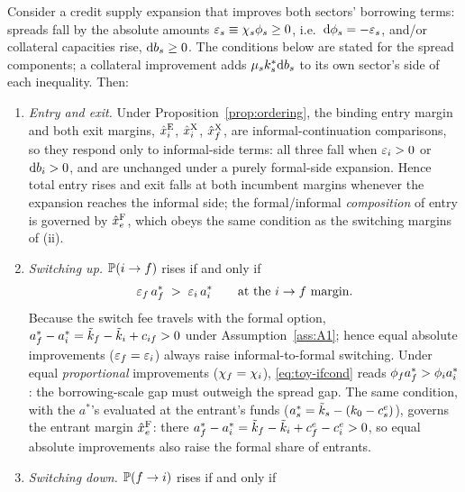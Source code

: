 \documentclass[12pt]{article}
\begin{document}
\begin{corollary}
\label{cor:bothmargins}
Consider a credit supply expansion that improves both sectors'
borrowing terms: spreads fall by the absolute amounts
$\varepsilon_{s}\equiv\chi_{s}\phi_{s}\geq0$, i.e.\
$\mathrm{d}\phi_{s}=-\varepsilon_{s}$, and/or collateral capacities
rise, $\mathrm{d}b_{s}\geq0$. The conditions below are stated for
the spread components; a collateral improvement adds
$\mu_{s}k^{*}_{s}\mathrm{d}b_{s}$ to its own sector's side of each
inequality. Then:
\begin{enumerate}
    \item[(i)] \emph{Entry and exit.} Under Proposition~\ref{prop:ordering}, the binding entry margin and both exit margins, $\hat{x}^{\mathrm{E}}_{i}$, $\hat{x}^{\mathrm{X}}_{i}$, $\hat{x}^{\mathrm{X}}_{f}$, are informal-continuation comparisons, so they respond only to informal-side terms: all three fall when $\varepsilon_{i}>0$ or $\mathrm{d}b_{i}>0$, and are unchanged under a purely formal-side expansion. Hence total entry rises and exit falls at both incumbent margins whenever the expansion reaches the informal side; the formal/informal \emph{composition} of entry is governed by $\hat{x}^{\mathrm{F}}_{e}$, which obeys the same condition as the switching margins of (ii).
    \item[(ii)] \emph{Switching up.} $\mathbb{P}(i\to f)$ rises if and only if
    \begin{equation}
        \varepsilon_{f}\,a^{*}_{f}
        \;>\;
        \varepsilon_{i}\,a^{*}_{i}
        \qquad\text{at the } i\to f \text{ margin.}
        \label{eq:toy-ifcond}
    \end{equation}
    Because the switch fee travels with the formal option, $a^{*}_{f}-a^{*}_{i}
    =\tilde{k}_{f}-\tilde{k}_{i}+c_{if}>0$ under Assumption~\ref{ass:A1}; hence equal absolute improvements ($\varepsilon_{f}=\varepsilon_{i}$) always raise informal-to-formal switching. Under equal \emph{proportional} improvements ($\chi_{f}=\chi_{i}$), \eqref{eq:toy-ifcond} reads $\phi_{f}a^{*}_{f}>\phi_{i}a^{*}_{i}$: the borrowing-scale gap must outweigh the spread gap. The same condition, with the $a^{*}$'s evaluated at the entrant's funds ($a^{*}_{s}=\tilde{k}_{s}-(k_{0}-c^{e}_{s})$), governs the entrant margin $\hat{x}^{\mathrm{F}}_{e}$: there $a^{*}_{f}-a^{*}_{i} =\tilde{k}_{f}-\tilde{k}_{i}+c^{e}_{f}-c^{e}_{i}>0$, so equal absolute improvements also raise the formal share of entrants.
    \item[(iii)] \emph{Switching down.} $\mathbb{P}(f\to i)$ rises if and only if

\end{enumerate}
\end{corollary}
\end{document}
